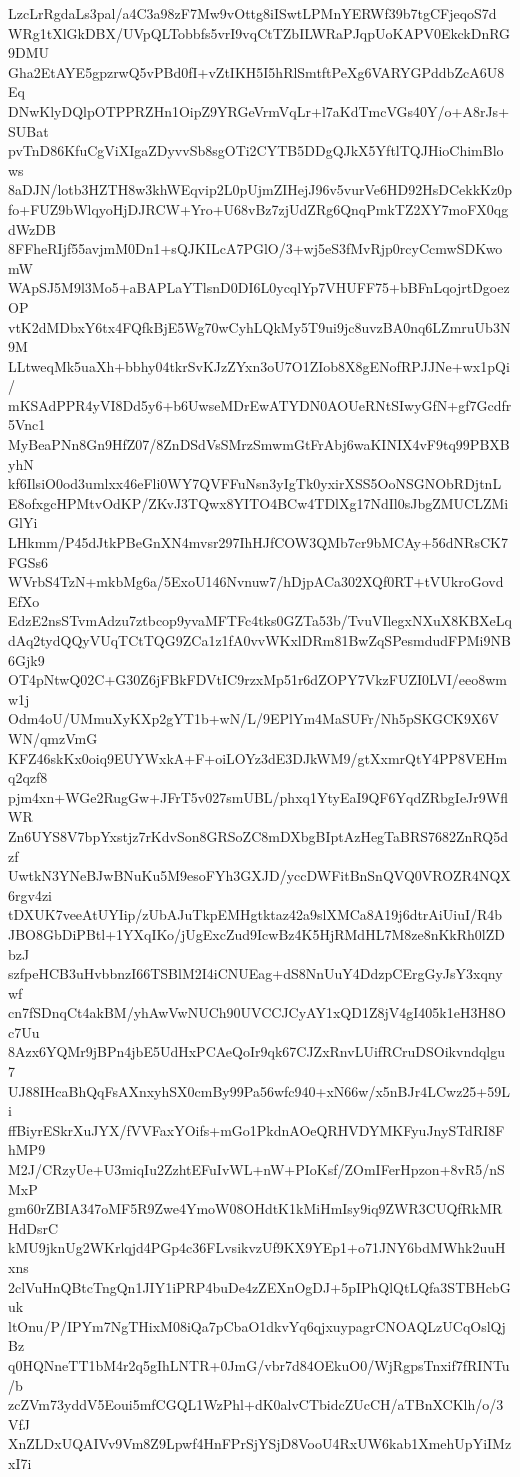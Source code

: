 LzcLrRgdaLs3pal/a4C3a98zF7Mw9vOttg8iISwtLPMnYERWf39b7tgCFjeqoS7d
WRg1tXlGkDBX/UVpQLTobbfs5vrI9vqCtTZbILWRaPJqpUoKAPV0EkckDnRG9DMU
Gha2EtAYE5gpzrwQ5vPBd0fI+vZtIKH5I5hRlSmtftPeXg6VARYGPddbZcA6U8Eq
DNwKlyDQlpOTPPRZHn1OipZ9YRGeVrmVqLr+l7aKdTmcVGs40Y/o+A8rJs+SUBat
pvTnD86KfuCgViXIgaZDyvvSb8sgOTi2CYTB5DDgQJkX5YftlTQJHioChimBlows
8aDJN/lotb3HZTH8w3khWEqvip2L0pUjmZIHejJ96v5vurVe6HD92HsDCekkKz0p
fo+FUZ9bWlqyoHjDJRCW+Yro+U68vBz7zjUdZRg6QnqPmkTZ2XY7moFX0qgdWzDB
8FFheRIjf55avjmM0Dn1+sQJKILcA7PGlO/3+wj5eS3fMvRjp0rcyCcmwSDKwomW
WApSJ5M9l3Mo5+aBAPLaYTlsnD0DI6L0ycqlYp7VHUFF75+bBFnLqojrtDgoezOP
vtK2dMDbxY6tx4FQfkBjE5Wg70wCyhLQkMy5T9ui9jc8uvzBA0nq6LZmruUb3N9M
LLtweqMk5uaXh+bbhy04tkrSvKJzZYxn3oU7O1ZIob8X8gENofRPJJNe+wx1pQi/
mKSAdPPR4yVI8Dd5y6+b6UwseMDrEwATYDN0AOUeRNtSIwyGfN+gf7Gcdfr5Vnc1
MyBeaPNn8Gn9HfZ07/8ZnDSdVsSMrzSmwmGtFrAbj6waKINIX4vF9tq99PBXByhN
kf6IlsiO0od3umlxx46eFli0WY7QVFFuNsn3yIgTk0yxirXSS5OoNSGNObRDjtnL
E8ofxgcHPMtvOdKP/ZKvJ3TQwx8YITO4BCw4TDlXg17NdIl0sJbgZMUCLZMiGlYi
LHkmm/P45dJtkPBeGnXN4mvsr297IhHJfCOW3QMb7cr9bMCAy+56dNRsCK7FGSs6
WVrbS4TzN+mkbMg6a/5ExoU146Nvnuw7/hDjpACa302XQf0RT+tVUkroGovdEfXo
EdzE2nsSTvmAdzu7ztbcop9yvaMFTFc4tks0GZTa53b/TvuVIlegxNXuX8KBXeLq
dAq2tydQQyVUqTCtTQG9ZCa1z1fA0vvWKxlDRm81BwZqSPesmdudFPMi9NB6Gjk9
OT4pNtwQ02C+G30Z6jFBkFDVtIC9rzxMp51r6dZOPY7VkzFUZI0LVI/eeo8wmw1j
Odm4oU/UMmuXyKXp2gYT1b+wN/L/9EPlYm4MaSUFr/Nh5pSKGCK9X6VWN/qmzVmG
KFZ46skKx0oiq9EUYWxkA+F+oiLOYz3dE3DJkWM9/gtXxmrQtY4PP8VEHmq2qzf8
pjm4xn+WGe2RugGw+JFrT5v027smUBL/phxq1YtyEaI9QF6YqdZRbgIeJr9WflWR
Zn6UYS8V7bpYxstjz7rKdvSon8GRSoZC8mDXbgBIptAzHegTaBRS7682ZnRQ5dzf
UwtkN3YNeBJwBNuKu5M9esoFYh3GXJD/yccDWFitBnSnQVQ0VROZR4NQX6rgv4zi
tDXUK7veeAtUYIip/zUbAJuTkpEMHgtktaz42a9slXMCa8A19j6dtrAiUiuI/R4b
JBO8GbDiPBtl+1YXqIKo/jUgExcZud9IcwBz4K5HjRMdHL7M8ze8nKkRh0lZDbzJ
szfpeHCB3uHvbbnzI66TSBlM2I4iCNUEag+dS8NnUuY4DdzpCErgGyJsY3xqnywf
cn7fSDnqCt4akBM/yhAwVwNUCh90UVCCJCyAY1xQD1Z8jV4gI405k1eH3H8Oc7Uu
8Azx6YQMr9jBPn4jbE5UdHxPCAeQoIr9qk67CJZxRnvLUifRCruDSOikvndqlgu7
UJ88IHcaBhQqFsAXnxyhSX0cmBy99Pa56wfc940+xN66w/x5nBJr4LCwz25+59Li
ffBiyrESkrXuJYX/fVVFaxYOifs+mGo1PkdnAOeQRHVDYMKFyuJnySTdRI8FhMP9
M2J/CRzyUe+U3miqIu2ZzhtEFuIvWL+nW+PIoKsf/ZOmIFerHpzon+8vR5/nSMxP
gm60rZBIA347oMF5R9Zwe4YmoW08OHdtK1kMiHmIsy9iq9ZWR3CUQfRkMRHdDsrC
kMU9jknUg2WKrlqjd4PGp4c36FLvsikvzUf9KX9YEp1+o71JNY6bdMWhk2uuHxns
2clVuHnQBtcTngQn1JIY1iPRP4buDe4zZEXnOgDJ+5pIPhQlQtLQfa3STBHcbGuk
ltOnu/P/IPYm7NgTHixM08iQa7pCbaO1dkvYq6qjxuypagrCNOAQLzUCqOslQjBz
q0HQNneTT1bM4r2q5gIhLNTR+0JmG/vbr7d84OEkuO0/WjRgpsTnxif7fRINTu/b
zcZVm73yddV5Eoui5mfCGQL1WzPhl+dK0alvCTbidcZUcCH/aTBnXCKlh/o/3VfJ
XnZLDxUQAIVv9Vm8Z9Lpwf4HnFPrSjYSjD8VooU4RxUW6kab1XmehUpYiIMzxI7i
